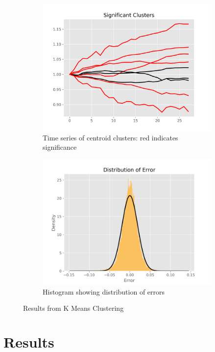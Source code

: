\documentclass{article}
\begin{document}
\begin{figure}[ht]
\centering
\begin{subfigure}{.5\textwidth}
  \centering
  \includegraphics[width=\linewidth]{SigClus.png}
  \caption{Time series of centroid clusters: red indicates significance}
  \label{kmeans:a}
\end{subfigure}%
\begin{subfigure}{.5\textwidth}
  \centering
  \includegraphics[width=\linewidth]{hist.png}
  \caption{Histogram showing distribution of errors}
  \label{kmeans:b}
\end{subfigure}
\caption{Results from K Means Clustering}
\label{kmeans}
\end{figure}
\section{Results}
\end{document}
